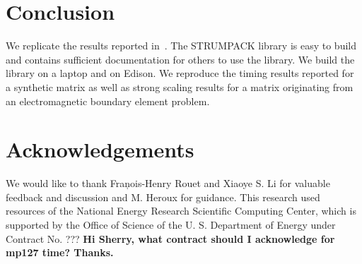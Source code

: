 \documentclass{acmsmall}
\newcommand{\dmcomment}[1]{\textbf{#1}}
\begin{document}
\section{Conclusion}

We replicate the results reported in~\cite{rouet:strumpack}.  The
STRUMPACK library is easy to build and contains sufficient
documentation for others to use the library.  We build the
library on a laptop and on Edison.  We reproduce the timing
results reported for a synthetic matrix as well as strong scaling
results for a matrix originating from an electromagnetic boundary
element problem.


\section{Acknowledgements}

We would like to thank Fran\c{}ois-Henry Rouet and Xiaoye S. Li for
valuable feedback and discussion and M. Heroux for guidance.
This research used resources of the National Energy Research
Scientific Computing Center, which is supported by the Office of
Science of the U. S. Department of Energy under Contract No. ???
\dmcomment{Hi Sherry, what contract should I acknowledge for
mp127 time? Thanks.}



\end{document}
